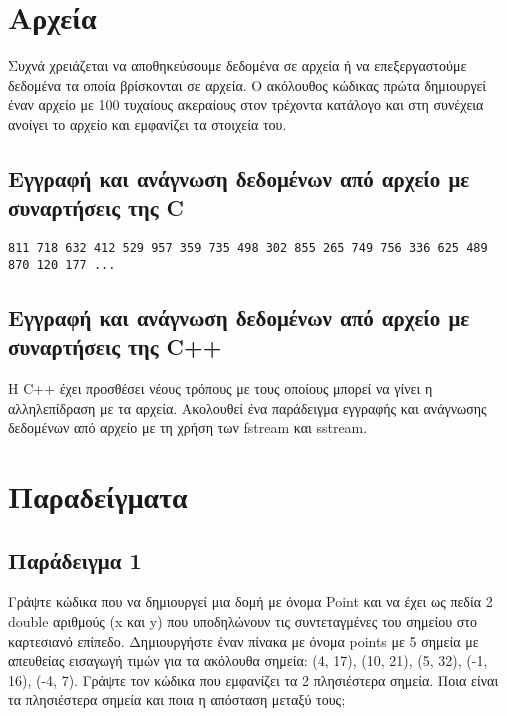 



\section{Αρχεία}
Συχνά χρειάζεται να αποθηκεύσουμε δεδομένα σε αρχεία ή να επεξεργαστούμε δεδομένα τα οποία βρίσκονται σε αρχεία. Ο ακόλουθος κώδικας πρώτα δημιουργεί έναν αρχείο με 100 τυχαίους ακεραίους στον τρέχοντα κατάλογο και στη συνέχεια ανοίγει το αρχείο και εμφανίζει τα στοιχεία του.

\subsection{Εγγραφή και ανάγνωση δεδομένων από αρχείο με συναρτήσεις της C}



\begin{lstlisting}[style=DOS]
811 718 632 412 529 957 359 735 498 302 855 265 749 756 336 625 489 870 120 177 ...
\end{lstlisting}

\subsection{Εγγραφή και ανάγνωση δεδομένων από αρχείο με συναρτήσεις της C++}
Η C++ έχει προσθέσει νέους τρόπους με τους οποίους μπορεί να γίνει η αλληλεπίδραση με τα αρχεία. Ακολουθεί ένα παράδειγμα εγγραφής και ανάγνωσης δεδομένων από αρχείο με τη χρήση των fstream και sstream.





\section{Παραδείγματα}
\subsection{Παράδειγμα 1}
Γράψτε κώδικα που να δημιουργεί μια δομή με όνομα Point και να έχει ως πεδία 2 double αριθμούς  (x και y) που υποδηλώνουν τις συντεταγμένες του σημείου στο καρτεσιανό επίπεδο. Δημιουργήστε έναν πίνακα με όνομα points με 5 σημεία με απευθείας εισαγωγή τιμών για τα ακόλουθα σημεία: (4, 17), (10, 21), (5, 32), (-1, 16), (-4, 7). Γράψτε τον κώδικα που εμφανίζει τα 2 πλησιέστερα σημεία. Ποια είναι τα πλησιέστερα σημεία και ποια η απόσταση μεταξύ τους;

